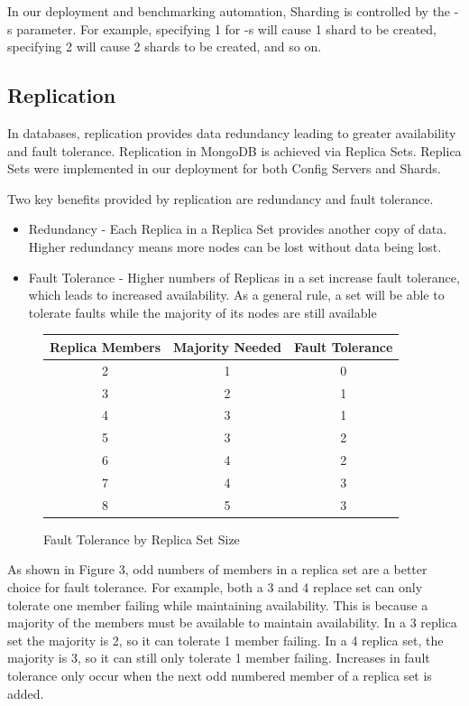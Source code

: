 \documentclass[9pt,twocolumn,twoside]{../../styles/osajnl}
\begin{document}
In our deployment and benchmarking automation, Sharding is controlled by the -s parameter.  For example, specifying 1 for -s will cause 1 shard to be created, specifying 2 will cause 2 shards to be created, and so on.

\subsection{Replication}

In databases, replication provides data redundancy leading to greater availability and fault tolerance.  Replication in MongoDB is achieved via Replica Sets. \cite{www-replication}  Replica Sets were implemented in our deployment for both Config Servers and Shards.

Two key benefits provided by replication are redundancy and fault tolerance.
\begin{itemize}
\item Redundancy - Each Replica in a Replica Set provides another copy of data.  Higher redundancy means more nodes can be lost without data being lost.
\item Fault Tolerance - Higher numbers of Replicas in a set increase fault tolerance, which leads to increased availability.  As a general rule, a set will be able to tolerate faults while the majority of its nodes are still available
\end{itemize}

\begin{figure}[ht]
\begin{center}
 \begin{tabular}{|c | c | c|} 
 \hline
Replica Members &  Majority Needed & Fault Tolerance \\ [0.5ex] 
 \hline\hline
    
2 &	1 &	0 \\
 \hline
3 &	2 &	1 \\ 
 \hline
4 &	3 &	1 \\ 
 \hline
5 &	3 &	2 \\ 
 \hline
6 &	4 &	2\\ 
 \hline
7 &	4 &	3\\ 
 \hline
8 &	5 &	3\\ [1ex] 
 \hline
\end{tabular}
\end{center}
  \caption{Fault Tolerance by Replica Set Size} \cite{www-mongoRepDep}
\end{figure}


As shown in Figure 3, odd numbers of members in a replica set are a better choice for fault tolerance. For example, both a 3 and 4 replace set can only tolerate one member failing while maintaining availability.  This is because a majority of the members must be available to maintain availability.  In a 3 replica set the majority is 2, so it can tolerate 1 member failing.  In a 4 replica set, the majority is 3, so it can still only tolerate 1 member failing.  Increases in fault tolerance only occur when the next odd numbered member of a replica set is added.  \cite{www-mongoRepDep}
\end{document}
